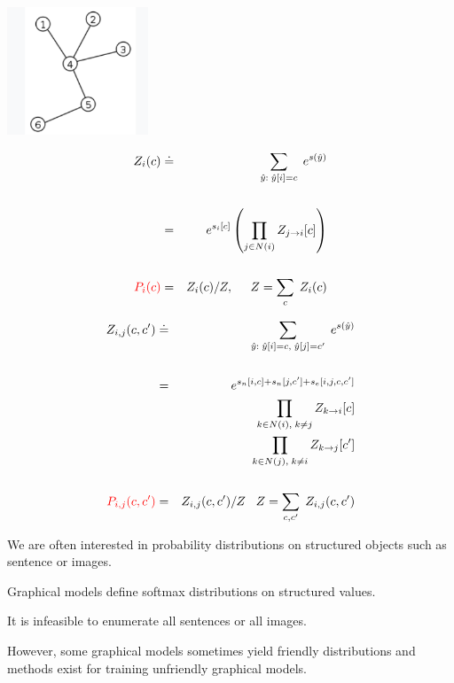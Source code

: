 {

\centerline{\includegraphics[height=1.5in]{../images/Tree}}

\begin{eqnarray*}
Z_i(c) & \doteq & \sum_{\hat{y}:\; \hat{y}[i] = c} \;e^{s(\hat{y})} \\
\\
& = & e^{s_i[c]} \left(\prod_{j\in N(i)} Z_{j \rightarrow i}[c]\right) \\
\\
{\color{red} P_i(c)} & = & Z_i(c)/Z,\;\;\;\;\; Z = \sum_{c}\;Z_i(c)
\end{eqnarray*}



\begin{eqnarray*}
Z_{i,j}(c,c') & \doteq & \sum_{\hat{y}:\; \hat{y}[i] = c,\;\hat{y}[j] = c'} \;e^{s(\hat{y})} \\
\\
& = & e^{s_n[i,c] + s_n[j,c'] +s_e[i,j,c,c']} \\
& & \prod_{k\in N(i),\;k \not = j} Z_{k \rightarrow i}[c] \\
& & \prod_{k\in N(j),\;k \not = i} Z_{k \rightarrow j}[c'] \\
\\
{\color{red} P_{i,j}(c,c')} & = & Z_{i,j}(c,c')/Z\;\;\;Z = \sum_{c,c'}\;Z_{i,j}(c,c')
\end{eqnarray*}



We are often interested in probability distributions on structured objects such as sentence or images.

\vfill
Graphical models define softmax distributions on structured values.

\vfill
It is infeasible to enumerate all sentences or all images.

\vfill
However, some graphical models sometimes yield friendly distributions and methods exist
for training unfriendly graphical models.


}


